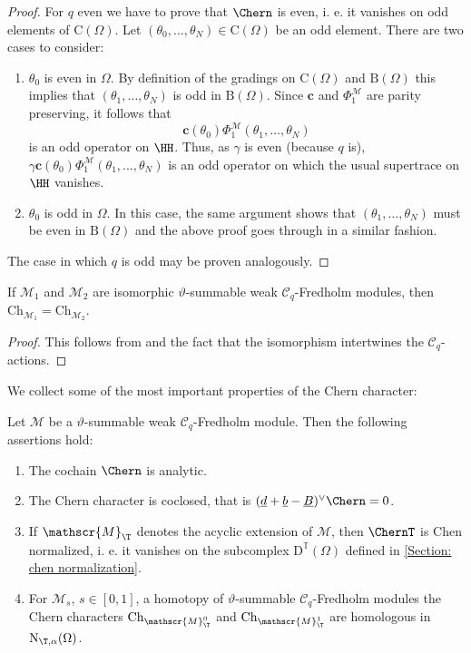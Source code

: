 \documentclass[a4paper, english, 12pt, bibliography=totocnumbered,
index=totoc]{scrartcl}
\begin{document}
\begin{proof}
	For $q$ even we have to prove that $\Chern$ is even, i. e. it vanishes on
	odd elements of $\mathrm{C}(\Omega)$.
	Let $(\theta_0, \ldots, \theta_N) \in \mathrm{C}(\Omega)$ be an odd
	element.
	There are two cases to consider:
	\begin{enumerate}
		\item $\theta_0$ is even in $\Omega$.
		By definition of the gradings on $\mathrm{C}(\Omega)$ and
		$\mathrm{B}(\Omega)$ this implies that $(\theta_1, \ldots, \theta_N)$
		is odd in $\mathrm{B}(\Omega)$.
		Since $\mathbf{c}$ and $\Phi_1^{\mathscr{M}}$ are parity preserving,
		it
		follows that
		\begin{equation*}
			\mathbf{c}(\theta_0) \Phi_1^{\mathscr{M}}(\theta_1, \ldots,
			\theta_N)
		\end{equation*}
		is an odd operator on $\HH$.
		Thus, as $\gamma$ is even (because $q$ is), $\gamma
		\mathbf{c}(\theta_0)\Phi_1^{\mathscr{M}}(\theta_1, \ldots, \theta_N)$
		is an odd operator on which the usual supertrace on $\HH$ vanishes.
		\item $\theta_0$ is odd in $\Omega$.
		In this case, the same argument shows that $(\theta_1, \ldots,
		\theta_N)$ must be even in $\mathrm{B}(\Omega)$ and the above proof
		goes through in a similar fashion.
	\end{enumerate}
	The case in which $q$ is odd may be proven analogously.
\end{proof}
\begin{lem}\label{Isomorphism Chern character}
	If $\mathscr{M}_1$ and $\mathscr{M}_2$ are isomorphic
	$\vartheta$-summable weak $\mathcal{C}_q$-Fredholm modules, then
	$\mathrm{Ch}_{\mathscr{M}_1} = \mathrm{Ch}_{\mathscr{M}_2}$.
\end{lem}
\begin{proof}
	This follows from  and the fact that the isomorphism intertwines the
	$\mathcal{C}_q$-actions.
\end{proof}
We collect some of the most important properties of the Chern character:
\begin{thm}\label{Thm ChM}
	Let $\mathscr{M}$ be a $\vartheta$-summable weak $\mathcal{C}_q$-Fredholm
	module.
	Then the following assertions hold:
	\begin{enumerate}
		\item The cochain $\Chern$ is analytic.
		\item The Chern character is coclosed, that is $(\underline{d} +
		\underline{b} - \underline{B})^\vee \Chern = 0$.
		\item If $\mathscr{M}_\T$ denotes the acyclic extension of
		$\mathscr{M}$, then $\ChernT$ is Chen normalized, i. e. it vanishes
		on the subcomplex $\mathrm{D}^{\mathbb{T}}(\Omega)$ defined in
		\cref{Section: chen normalization}.
		\item For $\mathscr{M}_s$, $s \in [0,1]$, a homotopy of
		$\vartheta$-summable $\mathcal{C}_q$-Fredholm modules
		the Chern characters $\mathrm{Ch}_{\mathscr{M}^0_\T}$ and
		$\mathrm{Ch}_{\mathscr{M}^1_\T}$ are homologous in
		$\mathrm{N}_{\T, \alpha}(\Omega)$.
	\end{enumerate}
\end{thm}
\end{document}
